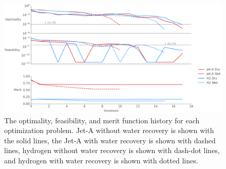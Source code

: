 \documentclass[conf]{new-aiaa}
\begin{document}
\begin{figure}[hbt!]
  \centering
  \includegraphics[width=1.0\textwidth]{opt_summary.pdf}
  \caption{The optimality, feasibility, and merit function history for each optimization problem.
    Jet-A without water recovery is shown with the solid lines, the Jet-A with water recovery is shown with dashed lines, hydrogen without water recovery is shown with dash-dot lines, and hydrogen with water recovery is shown with dotted lines.}
  \label{fig:history_summary}
\end{figure}

\end{document}
